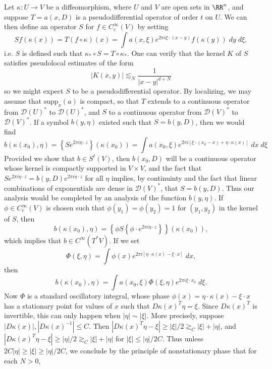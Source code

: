 Let $\kappa: U \to V$ be a diffeomorphism, where $U$ and $V$ are open sets in $\RR^n$, and suppose $T = a(x,D)$ is a pseudodifferential operator of order $t$ on $U$. We can then define an operator $S$ for $f \in C_c^\infty(V)$ by setting
%
\[ Sf(\kappa(x)) = T(f \circ \kappa)(x) = \int a(x,\xi) e^{2 \pi i \xi \cdot (x - y)} f(\kappa(y))\; dy\; d\xi, \]
%
i.e. $S$ is defined such that $\kappa_* \circ S = T \circ \kappa_*$. One can verify that the kernel $K$ of $S$ satisfies pseudolocal estimates of the form
%
\[ |K(x,y)| \lesssim_N \frac{1}{|x - y|^{d+N}} \]
%
so we might expect $S$ to be a pseudodifferential operator. By localizing, we may assume that $\text{supp}_x(a)$ is compact, so that $T$ extends to a continuous operator from $\mathcal{D}(U)^*$ to $\mathcal{D}(U)^*$, and $S$ to a continuous operator from $\mathcal{D}(V)^*$ to $\mathcal{D}(V)^*$. If a symbol $b(y,\eta)$ existed such that $S = b(y,D)$, then we would find
%
\[ b(\kappa(x_0),\eta) = \left\{ S e^{2 \pi i \eta \cdot z} \right\}(\kappa(x_0)) = \int a(x_0,\xi) e^{2 \pi i [\xi \cdot (x_0 - x) + \eta \cdot \kappa(x)]}\; dx\; d\xi \]
%
Provided we show that $b \in S^t(V)$, then $b(x_0,D)$ will be a continuous operator whose kernel is compactly supported in $V \times V$, and the fact that $S e^{2 \pi i \eta \cdot z} = b(y,D) e^{2 \pi i \eta \cdot z}$ for all $\eta$ implies, by continuinty and the fact that linear combinations of exponentials are dense in $\mathcal{D}(V)^*$, that $S = b(y,D)$. Thus our analysis would be completed by an analysis of the function $b(y,\eta)$. If $\phi \in C_c^\infty(V)$ is chosen such that $\phi(y_1) = \phi(y_2) = 1$ for $(y_1,y_2)$ in the kernel of $S$, then
%
\[ b(\kappa(x_0),\eta) = \left\{ \phi S \left\{ \phi \cdot e^{2 \pi i \eta \cdot z} \right\} \right\}(\kappa(x_0)), \]
%
which implies that $b \in C^\infty(T^* V)$. If we set
%
\[ \Phi(\xi,\eta) = \int \phi(x) e^{2 \pi i [ \eta \cdot \kappa(x) - \xi \cdot x ]}\; dx, \]
%
then
%
\[ b(\kappa(x_0), \eta) = \int a(x_0,\xi) \Phi(\xi,\eta) e^{2 \pi i \xi \cdot x_0}\; d\xi. \]
%
Now $\Phi$ is a standard oscillatory integral, whose phase $\phi(x) = \eta \cdot \kappa(x) - \xi \cdot x$ has a stationary point for values of $x$ such that $D\kappa(x)^T \eta = \xi$. Since $D\kappa(x)^T$ is invertible, this can only happen when $|\eta| \sim |\xi|$. More precisely, suppose $|D\kappa(x)|, |D\kappa(x)^{-1}| \leq C$. Then $|D\kappa(x)^T \eta - \xi| \geq |\xi|/2 \gtrsim_C |\xi| + |\eta|$, and $|D\kappa(x)^T \eta - \xi| \geq |\eta|/2 \gtrsim_C |\xi| + |\eta|$ for $|\xi| \leq |\eta|/2C$. Thus unless $2C|\eta| \geq |\xi| \geq |\eta|/2C$, we conclude by the principle of nonstationary phase that for each $N > 0$,
